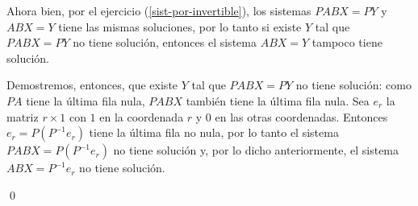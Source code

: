 \documentclass[a4paper,12pt,twoside,spanish,reqno]{amsbook}
\numberwithin{equation}{section}
\begin{document}
\begin{enumerate}[topsep=6pt,itemsep=.4cm]
Ahora bien, por el ejercicio (\ref{sist-por-invertible}), los sistemas $PABX=PY$ y $ABX=Y$ tiene las mismas soluciones, por lo tanto si existe $Y$ tal que $PABX=PY$ no tiene solución, entonces el sistema $ABX=Y$ tampoco tiene solución. 

Demostremos, entonces, que existe $Y$  tal que $PABX=PY$ no tiene solución: como $PA$ tiene la última fila nula, $PABX$ también tiene la última fila nula. Sea $e_r$ la matriz $r \times 1$ con $1$ en la coordenada $r$ y $0$  en las otras coordenadas. Entonces $e_r = P(P^{-1}e_r)$  tiene la última fila no nula, por lo tanto el sistema $PABX=P(P^{-1}e_r)$ no tiene solución y, por lo dicho anteriormente, el sistema   $ABX=P^{-1}e_r$ no tiene solución.

\qed 


\end{enumerate}
\end{document}
